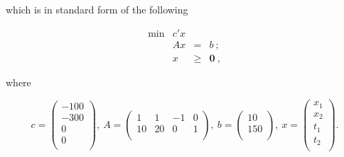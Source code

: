 which is in standard form of the following

\[
\tag{P}
\begin{array}{rrcl}
 \min & c'x  &      &   \\
      &  Ax  &   =  & b~; \\
      &   x  & \geq & \mathbf{0}~,
\end{array}
\]

where

$$
c = 
\left(
  \begin{array}{c}
    -100 \\
    -300 \\
    0 \\
    0 \\
  \end{array}
\right),~
A = 
\left(
  \begin{array}{cccc}
    1 & 1 & -1 & 0 \\
    10 & 20 & 0 & 1 \\
  \end{array}
\right),~
b =
\left(
  \begin{array}{c}
    10 \\
    150 \\
  \end{array}
\right),~
x =
\left(
  \begin{array}{c}
    x_1 \\
    x_2 \\
    t_1 \\
    t_2 \\
  \end{array}
\right).
$$
